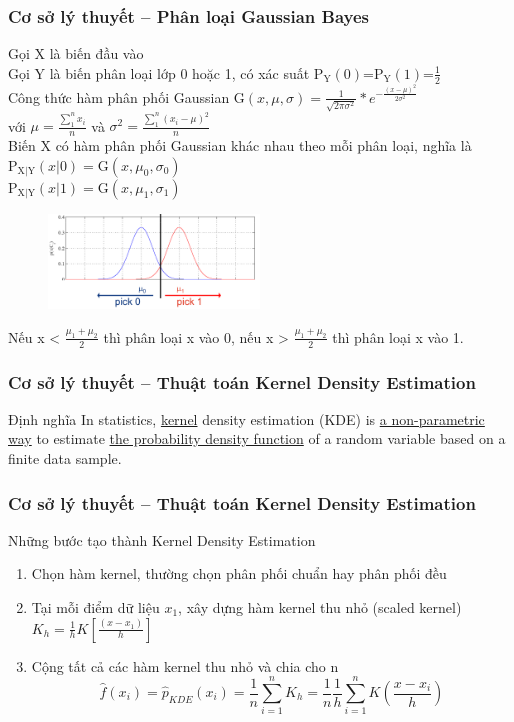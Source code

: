\documentclass{beamer}
\begin{document}
\begin{frame}[t]
\frametitle{Cơ sở lý thuyết -- Phân loại Gaussian Bayes}
Gọi X là biến đầu vào\\
Gọi Y là biến phân loại lớp 0 hoặc 1, có xác suất $\mathrm{P_Y}(0)$=$\mathrm{P_Y}(1)$=$\frac{1}{2}$\\
Công thức hàm phân phối Gaussian 
$
\mathrm{G}(x,\mu,\sigma)=\frac{1}{\sqrt{2\pi\sigma^2}} * e^{-\frac{(x-\mu)^2}{2\sigma^2}}  
$\\
với $\mu=\frac{\sum_1^n x_i}{n}$ và $\sigma^2=\frac{\sum_1^n (x_i-\mu)^2}{n}$\\
Biến X có hàm phân phối Gaussian khác nhau theo mỗi phân loại, nghĩa là \\
$\mathrm{P_{X|Y}}(x|0)=\mathrm{G}(x,\mu_0,\sigma_0)$\\
$\mathrm{P_{X|Y}}(x|1)=\mathrm{G}(x,\mu_1,\sigma_1)$\\
\begin{figure}[h]
  \centering
    \includegraphics[width=0.5\textwidth]{GaussBayesEx2.png}    
\end{figure}
Nếu x < $\frac{\mu_1+\mu_2}{2}$ thì phân loại x vào 0, nếu x > $\frac{\mu_1+\mu_2}{2}$ thì phân loại x vào 1.
\end{frame}


\begin{frame}[t]
\frametitle{Cơ sở lý thuyết -- Thuật toán Kernel Density Estimation}
\begin{block}{Định nghĩa}
In statistics, \underline{kernel} density estimation (KDE) is \underline{a non-parametric way} to estimate \underline{the probability density function} of a random variable based on a finite data sample.
\end{block}
\end{frame}


\begin{frame}[t]
\frametitle{Cơ sở lý thuyết -- Thuật toán Kernel Density Estimation}
Những bước tạo thành Kernel Density Estimation
\begin{enumerate}
\item Chọn hàm kernel, thường chọn phân phối chuẩn hay phân phối đều
\item Tại mỗi điểm dữ liệu $x_1$, xây dựng hàm kernel thu nhỏ (scaled kernel) $K_h = \frac{1}{h}K[\frac{(x-x_1)}{h}]$
\item Cộng tất cả các hàm kernel thu nhỏ và chia cho n
\[
\hat{f}(x_i) = \hat{p}_{KDE}(x_i) = \frac{1}{n}\sum_{i=1}^{n} K_h = \frac{1}{n}\frac{1}{h}\sum_{i=1}^{n} K(\frac{x-x_i}{h})
\]
\end{enumerate}
\end{frame}
\end{document}
